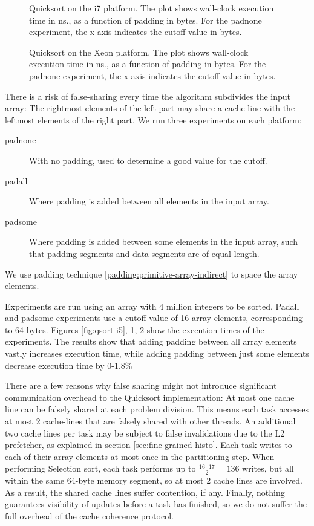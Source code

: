 \begin{figure}[hbpt]
\graphicspath{{plots/}}

	\caption{Quicksort on the i7 platform. The plot shows wall-clock execution time in
	ns., as a function of padding in bytes. For the padnone experiment, the
	x-axis indicates the cutoff value in bytes.}
	\label{fig:qsort-i7}
\end{figure}

\begin{figure}[hbpt]
\graphicspath{{plots/}}

	\caption{Quicksort on the Xeon platform. The plot shows wall-clock execution time in
	ns., as a function of padding in bytes. For the padnone experiment, the
	x-axis indicates the cutoff value in bytes.}
	\label{fig:qsort-xeon}
\end{figure}

There is a risk of false-sharing every time the algorithm subdivides the input
array: The rightmost elements of the left part may share a cache line with the
leftmost elements of the right part. We run three experiments on each platform:
\begin{description}
	\item[padnone] With no padding, used to determine a good value for the cutoff.
	\item[padall] Where padding is added between all elements in the input
		array.
	\item[padsome] Where padding is added between some elements in the input
		array, such that padding segments and data segments are of equal
		length.
\end{description}
We use padding technique
\ref{padding:primitive-array-indirect} to space the array elements.

Experiments are run using an array with 4 million integers to be sorted. Padall
and padsome experiments use a cutoff value of 16 array elements, corresponding
to 64 bytes. Figures \ref{fig:qsort-i5}, \ref{fig:qsort-i7},
\ref{fig:qsort-xeon} show the execution times of the experiments. The results
show that adding padding between all array elements vastly increases execution
time, while adding padding between just some elements decrease execution time by
0-1.8\%

There are a few reasons why false sharing might not introduce significant
communication overhead to the Quicksort implementation: At most one cache line 
can be falsely shared at each problem division. This means each task
accesses at most 2 cache-lines that are falsely shared with other threads. An
additional two cache lines per task may be subject
to false invalidations due to the L2 prefetcher, as explained in
section \ref{sec:fine-grained-histo}. Each task writes to each of their array
elements at most once in the partitioning step. When performing
Selection sort, each task performs up to $\frac{16\cdot17}{2} = 136$ writes, but all
within the same 64-byte memory segment, so at most 2 cache lines are involved.
As a result, the shared cache lines suffer contention, if any. Finally, nothing
guarantees visibility of updates before a task has finished, so we do not suffer
the full overhead of the cache coherence protocol.

